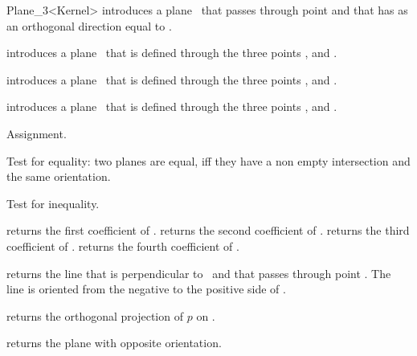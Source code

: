 \begin{ccRefClass} {Plane_3<Kernel>}
{introduces a plane \ccVar\ that passes through point  and
 that has as an orthogonal direction equal to .}

{introduces a plane \ccVar\ that is defined through the  three points 
 ,  and .}

{introduces a plane \ccVar\ that is defined through the  three points 
 ,  and .}

{introduces a plane \ccVar\ that is defined through the  three points 
 ,  and .}

\ccOperations
\ccHidden {}
        {Assignment.}

       {Test for equality: two planes are equal, iff they have a non 
        empty intersection and the same orientation.}

       {Test for inequality.}

       {returns the first coefficient of \ccVar.}
\ccGlue
{}
       {returns the second coefficient of \ccVar.}
\ccGlue
{}
       {returns the third coefficient of \ccVar.}
\ccGlue
{}
       {returns the fourth coefficient of \ccVar.}

       {returns the line that is perpendicular to \ccVar\ and that
        passes through point . The line is oriented from
        the negative to the positive side of \ccVar.}

       {returns the orthogonal projection of $p$ on \ccVar.}

       {returns the plane with opposite orientation.}


\end{ccRefClass}
